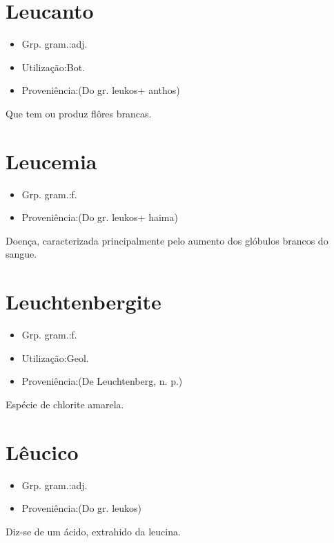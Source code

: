 \section{Leucanto}
\begin{itemize}
\item {Grp. gram.:adj.}
\end{itemize}
\begin{itemize}
\item {Utilização:Bot.}
\end{itemize}
\begin{itemize}
\item {Proveniência:(Do gr. \textunderscore leukos\textunderscore  + \textunderscore anthos\textunderscore )}
\end{itemize}
Que tem ou produz flôres brancas.
\section{Leucemia}
\begin{itemize}
\item {Grp. gram.:f.}
\end{itemize}
\begin{itemize}
\item {Proveniência:(Do gr. \textunderscore leukos\textunderscore  + \textunderscore haima\textunderscore )}
\end{itemize}
Doença, caracterizada principalmente pelo aumento dos glóbulos brancos do sangue.
\section{Leuchtenbergite}
\begin{itemize}
\item {Grp. gram.:f.}
\end{itemize}
\begin{itemize}
\item {Utilização:Geol.}
\end{itemize}
\begin{itemize}
\item {Proveniência:(De \textunderscore Leuchtenberg\textunderscore , n. p.)}
\end{itemize}
Espécie de chlorite amarela.
\section{Lêucico}
\begin{itemize}
\item {Grp. gram.:adj.}
\end{itemize}
\begin{itemize}
\item {Proveniência:(Do gr. \textunderscore leukos\textunderscore )}
\end{itemize}
Diz-se de um ácido, extrahido da leucina.

